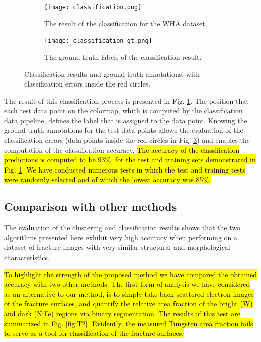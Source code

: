 \documentclass[authoryear,preprint,review,12pt, singleside]{elsarticle}
\begin{document}
\begin{figure}[!h]
	\centering
	\begin{subfigure}[b]{0.49\textwidth}
		\centering
		\texttt{[image: classification.png]}
		\caption{The result of the classification for the WHA dataset.}
		\label{fig:classification}
	\end{subfigure}
	\begin{subfigure}[b]{0.49\textwidth}
		\centering
		\texttt{[image: classification\_gt.png]}
		\caption{The ground truth labels of the classification result.}
		\label{fig:classification_gt}
	\end{subfigure}
	\caption{Classification results and ground truth annotations, with classification errors inside the red circles.}
\end{figure}



The result of this classification process is presented in Fig. \ref{fig:classification}. The position that each test data point on the colormap, which is computed by the classification data pipeline, defines the label that is assigned to the data point. Knowing the ground truth annotations for the test data points allows the evaluation of the classification errors (data points inside the red circles in Fig. \ref{fig:classification_gt}) and enables the computation of the classification accuracy. \hl{The accuracy of the classification predictions is computed to be 93\%, for the test and training sets demonstrated in Fig. {\ref{fig:classification}}. We have conducted numerous tests in which the test and training tests were randomly selected and of which the lowest accuracy was 85\%.} 


\subsection{Comparison with other methods}

The evaluation of the clustering and classification results shows that the two algorithms presented here exhibit very high accuracy when performing on a dataset of fracture images with very similar structural and morphological characteristics. 

\hl{To highlight the strength of the proposed method we have compared the obtained accuracy with two other methods. The first form of analysis we have considered as an alternative to our method, is to simply take back-scattered electron images of the fracture surfaces, and quantify the relative area fraction of the bright (W) and dark (NiFe) regions via binary segmentation. The results of this test are summarized in Fig. {\ref{fig:T2}}. Evidently, the measured Tungsten area fraction fails to serve as a tool for classification of the fracture surfaces. }
\end{document}
